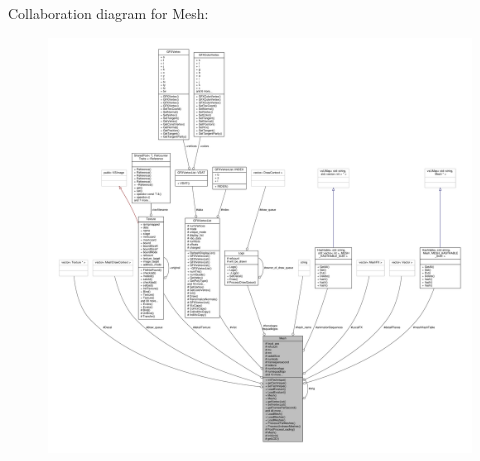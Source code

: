 Collaboration diagram for Mesh\+:
\nopagebreak
\begin{figure}[H]
\begin{center}
\leavevmode
\includegraphics[width=350pt]{da/d2b/classMesh__coll__graph}
\end{center}
\end{figure}
